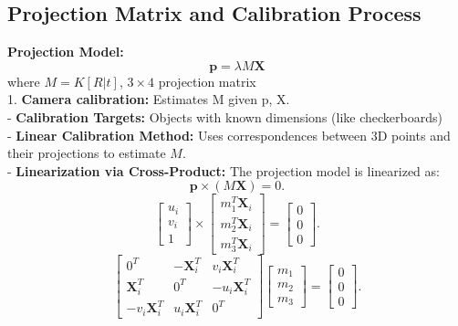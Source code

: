 \subsection*{Projection Matrix and Calibration Process}
\textbf{Projection Model:} 
   \[
   \mathbf{p} = \lambda M \mathbf{X}
   \]
   where \(M = K [R | t]\), \(3 \times 4\) projection matrix \\
1. \textbf{Camera calibration:} Estimates M given p, X.   \\
- \textbf{Calibration Targets:} Objects with known dimensions (like checkerboards) \\
- \textbf{Linear Calibration Method:} Uses correspondences between 3D points and their projections to estimate \(M\). \\
   - \textbf{Linearization via Cross-Product:} The projection model is linearized as:
     \[
     \mathbf{p} \times (M \mathbf{X}) = 0.
     \]
       \[
       \begin{bmatrix}
       u_i \\
       v_i \\
       1
       \end{bmatrix}
       \times
       \begin{bmatrix}
       m_1^T \mathbf{X}_i \\
       m_2^T \mathbf{X}_i \\
       m_3^T \mathbf{X}_i
       \end{bmatrix}
       =
       \begin{bmatrix}
       0 \\
       0 \\
       0
       \end{bmatrix}.
       \]
    \[
   \begin{bmatrix}
       0^T & -\mathbf{X}_i^T & v_i \mathbf{X}_i^T \\
       \mathbf{X}_i^T & 0^T & -u_i \mathbf{X}_i^T \\
       -v_i \mathbf{X}_i^T & u_i \mathbf{X}_i^T & 0^T
       \end{bmatrix}
       \begin{bmatrix}
       m_1 \\
       m_2 \\
       m_3
       \end{bmatrix}
       =
       \begin{bmatrix}
       0 \\
       0 \\
       0
       \end{bmatrix}.
    \]
